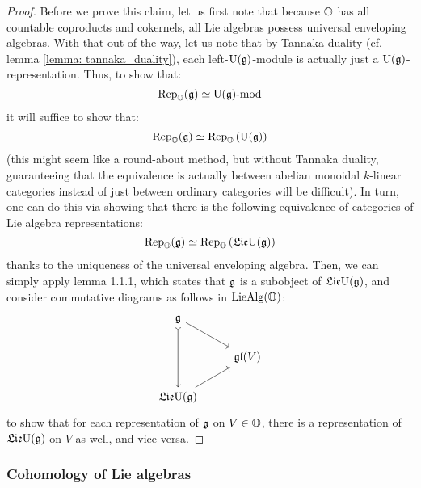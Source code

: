                     \begin{proof}
                        Before we prove this claim, let us first note that because $\mathbb{O}$ has all countable coproducts and cokernels, all Lie algebras possess universal enveloping algebras. With that out of the way, let us note that by Tannaka duality (cf. lemma \ref{lemma: tannaka_duality}), each left-$\mathrm{U}(\mathfrak{g})$-module is actually just a $\mathrm{U}(\mathfrak{g})$-representation. Thus, to show that:
                            $$\mathrm{Rep}_{\mathbb{O}}(\mathfrak{g}) \simeq {\mathrm{U}(\mathfrak{g})}\text{-}\mathrm{mod}$$
                        it will suffice to show that:
                            $$\mathrm{Rep}_{\mathbb{O}}(\mathfrak{g}) \simeq \mathrm{Rep}_{\mathbb{O}}\left(\mathrm{U}(\mathfrak{g})\right)$$
                        (this might seem like a round-about method, but without Tannaka duality, guaranteeing that the equivalence is actually between abelian monoidal $k$-linear categories instead of just between ordinary categories will be difficult). In turn, one can do this via showing that there is the following equivalence of categories of Lie algebra representations:
                            $$\mathrm{Rep}_{\mathbb{O}}(\mathfrak{g}) \simeq \mathrm{Rep}_{\mathbb{O}}\left(\mathfrak{Lie} \mathrm{U}(\mathfrak{g})\right)$$
                        thanks to the uniqueness of the universal enveloping algebra. Then, we can simply apply lemma 1.1.1, which states that $\mathfrak{g}$ is a subobject of $\mathfrak{Lie} \mathrm{U}(\mathfrak{g})$, and consider commutative diagrams as follows in $\mathrm{Lie}\mathrm{Alg}(\mathbb{O})$:
                            $$
                                \begin{tikzcd}
                                	{\g} \\
                                	& {\frakgl(V)} \\
                                	{\frakLie \U(\g)}
                                	\arrow[from=1-1, to=2-2]
                                	\arrow[from=3-1, to=2-2]
                                	\arrow[from=1-1, to=3-1, tail]
                                \end{tikzcd}
                            $$
                        to show that for each representation of $\mathfrak{g}$ on $V \in \mathbb{O}$, there is a representation of $\mathfrak{Lie} \mathrm{U}(\mathfrak{g})$ on $V$ as well, and vice versa.
                    \end{proof}
                    
            \subsubsection{Cohomology of Lie algebras}
